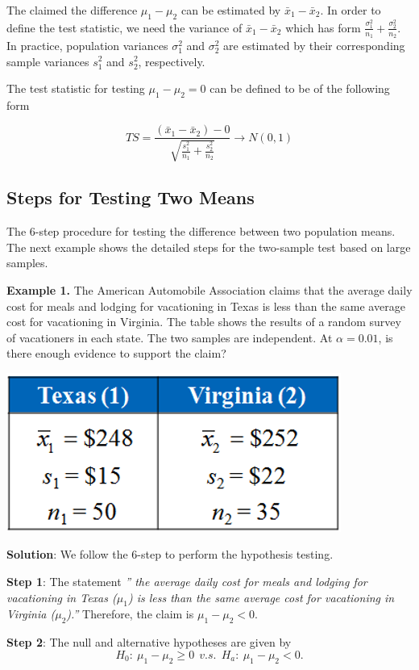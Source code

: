 \documentclass[
]{book}
\begin{document}
The claimed the difference \(\mu_1 - \mu_2\) can be estimated by \(\bar{x}_1 - \bar{x}_2\). In order to define the test statistic, we need the variance of \(\bar{x}_1 - \bar{x}_2\) which has form \(\frac{\sigma_1^2}{n_1} + \frac{\sigma_2^2}{n_2}\). In practice, population variances \(\sigma_1^2\) and \(\sigma_2^2\) are estimated by their corresponding sample variances \(s_1^2\) and \(s_2^2\), respectively.

The test statistic for testing \(\mu_1 -\mu_2 = 0\) can be defined to be of the following form

\[
TS = \frac{(\bar{x}_1 - \bar{x}_2) -0}{\sqrt{\frac{s_1^2}{n_1} + \frac{s_2^2}{n_2}}} \to N(0, 1)
\]

\hypertarget{steps-for-testing-two-means}{%
\subsection{Steps for Testing Two Means}\label{steps-for-testing-two-means}}

The 6-step procedure for testing the difference between two population means. The next example shows the detailed steps for the two-sample test based on large samples.

\hfill\break

\textbf{Example 1.} The American Automobile Association claims that the average daily cost for meals and lodging for vacationing in Texas is less than the same average cost for vacationing in Virginia. The table shows the results of a random survey of vacationers in each state. The two samples are independent. At \(\alpha = 0.01\), is there enough evidence to support the claim?

\includegraphics[width=0.3\linewidth]{week11/example01Data}

\textbf{Solution}: We follow the 6-step to perform the hypothesis testing.

\textbf{Step 1}: The statement \emph{'' the average daily cost for meals and lodging for vacationing in Texas (\(\mu_1\)) is less than the same average cost for vacationing in Virginia (\(\mu_2\)).''} Therefore, the claim is \(\mu_1 - \mu_2 < 0\).

\textbf{Step 2}: The null and alternative hypotheses are given by
\[
H_0: \ \mu_1 - \mu_2 \ge 0    \  \  v.s. \  \  H_a: \ \mu_1 - \mu_2 < 0.
\]
\end{document}
